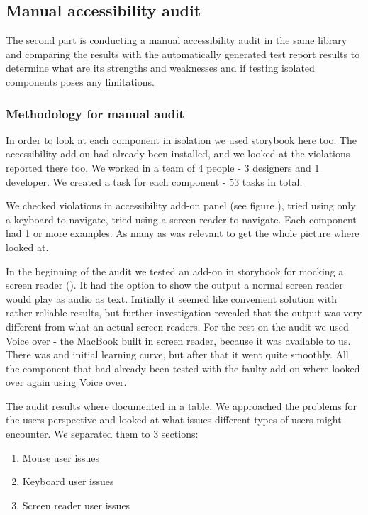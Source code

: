 \documentclass{master_thesis}
\begin{document}
\subsection{Manual accessibility audit}

The second part is conducting a manual accessibility audit in the same library and comparing the results with the automatically generated test report results to determine what are its strengths and weaknesses and if testing isolated components poses any limitations.
\subsubsection{Methodology for manual audit}
In order to look at each component in isolation we used storybook here too. The accessibility add-on had already been installed, and we looked at the violations reported there too. We worked in a team of 4 people - 3 designers and 1 developer. We created a task for each component - 53 tasks in total.

We checked violations in accessibility add-on panel (see figure ), tried using only a keyboard to navigate, tried using a screen reader to navigate. Each component had 1 or more examples. As many as was relevant to get the whole picture where looked at.

In the beginning of the audit we tested an add-on in storybook for mocking a screen reader (). It had the option to show the output a normal screen reader would play as audio as text. Initially it seemed like convenient solution with rather reliable results, but further investigation revealed that the output was very different from what an actual screen readers. For the rest on the audit we used Voice over - the MacBook built in screen reader, because it was available to us. There was and initial learning curve, but after that it went quite smoothly. All the component that had already been tested with the faulty add-on where looked over again using Voice over.

The audit results where documented in a table. We approached the problems for the users perspective and looked at what issues different types of users might encounter. We separated them to 3 sections:
\begin{enumerate}
	\item Mouse user issues
	\item Keyboard user issues
	\item Screen reader user issues
\end{enumerate}
\end{document}
